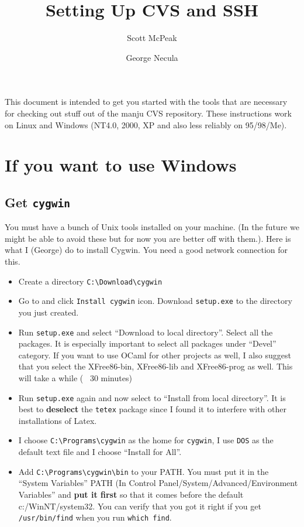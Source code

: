 \documentclass{article}
\title{Setting Up CVS and SSH}
\author{Scott McPeak \and George Necula}
\def\t#1{{\tt #1}}
\def\cvshost{manju}
\begin{document}
\maketitle

 This document is intended to get you started with the tools that are
necessary for checking out stuff out of the \cvshost{} CVS repository. These
instructions work on Linux and Windows (NT4.0, 2000, XP and also less reliably
on 95/98/Me).

\section{If you want to use Windows}

 \subsection{Get \t{cygwin}}

 You must have a bunch of Unix tools installed on your machine. (In the future
we might be able to avoid these but for now you are better off with them.).
Here is what I (George) do to install Cygwin. You need a good network
connection for this. 
\begin{itemize}
\item Create a directory \t{C:\backslash Download\backslash cygwin}
\item Go to  and click \t{Install
cygwin} icon. Download \t{setup.exe} to the directory you just created.
\item Run \t{setup.exe} and select ``Download to local directory''. Select all
the packages. It is especially important to select all packages under
``Devel'' category. If you want to use OCaml for other projects as well, I
also suggest that you select the XFree86-bin, XFree86-lib and XFree86-prog as
well. This will take a while (~ 30 minutes)
\item Run \t{setup.exe} again and now select to ``Install from local
directory''. It is best to {\bf deselect} the \t{tetex} package since I found
it to interfere with other installations of Latex.
\item I choose \t{C:\backslash Programs\backslash cygwin} 
as the home for \t{cygwin}, I use \t{DOS} as the default text file and I
choose ``Install for All''. 
\item Add \t{C:\backslash Programs\backslash cygwin\backslash bin} to your
PATH. You must put it in the ``System Variables'' PATH (In Control Panel/System/Advanced/Environment
Variables'' and {\bf put it first} so that it comes before the default
c:/WinNT/system32. You can verify that you got it right if you get
\t{/usr/bin/find} when you run \t{which find}. 
\end{itemize}
\end{document}
